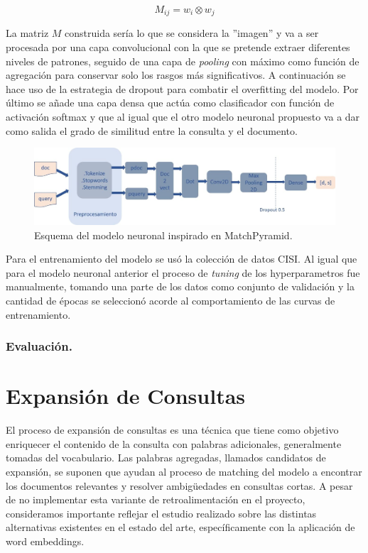 \documentclass{llncs}
\begin{document}
 \begin{equation}
 \label{eq1}
 M_{ij} = w_i \otimes w_j
 \end{equation} 
  
 La matriz $M$ construida sería lo que se considera la ''imagen'' y va a ser procesada por una capa convolucional con la que se pretende extraer diferentes niveles de patrones, seguido de una capa de \textit{pooling} con máximo como función de agregación para conservar solo los rasgos más significativos. A continuación se hace uso de la estrategia de dropout para combatir el overfitting del modelo. Por último se añade una capa densa que actúa como clasificador con función de activación softmax y que al igual que el otro modelo neuronal propuesto va a dar como salida el grado de similitud entre la consulta y el documento. 

\begin{figure}
	\begin{center}
		\includegraphics[width=\linewidth]{ ./images/match.jpg}
		\caption{Esquema del modelo neuronal inspirado en MatchPyramid.}
		\label{matchpyramid}
	\end{center}
\end{figure}

Para el entrenamiento del modelo se usó la colección de datos CISI. Al igual que para el modelo neuronal anterior el proceso de \textit{tuning} de los hyperparametros fue manualmente, tomando una parte de los datos como conjunto de validación y la cantidad de épocas se seleccionó acorde al comportamiento de las curvas de entrenamiento.

\subsubsection{Evaluación.}

\section{Expansión de Consultas}
El proceso de expansión de consultas es una técnica que tiene como objetivo enriquecer el contenido de la consulta con palabras adicionales, generalmente tomadas del vocabulario. Las palabras agregadas, llamados candidatos de expansión, se suponen que ayudan al proceso de matching del modelo a encontrar los documentos relevantes y resolver ambig\"uedades en consultas cortas. A pesar de no implementar esta variante de retroalimentación en el proyecto, consideramos importante reflejar el estudio realizado sobre las distintas alternativas existentes en el estado del arte, específicamente con la aplicación de word embeddings.  
\end{document}
